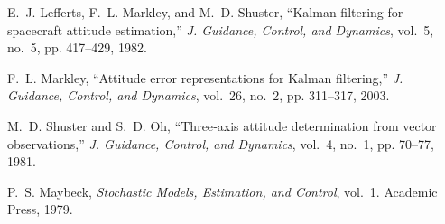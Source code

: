 \documentclass[12pt,letterpaper]{article}
\begin{document}
\begin{thebibliography}{9}
E.~J. Lefferts, F.~L. Markley, and M.~D. Shuster, “Kalman filtering for spacecraft attitude estimation,” \emph{J. Guidance, Control, and Dynamics}, vol.~5, no.~5, pp. 417–429, 1982.

F.~L. Markley, “Attitude error representations for Kalman filtering,” \emph{J. Guidance, Control, and Dynamics}, vol.~26, no.~2, pp. 311–317, 2003.

M.~D. Shuster and S.~D. Oh, “Three‐axis attitude determination from vector observations,” \emph{J. Guidance, Control, and Dynamics}, vol.~4, no.~1, pp. 70–77, 1981.

P.~S. Maybeck, \emph{Stochastic Models, Estimation, and Control}, vol.~1. Academic Press, 1979.

\end{thebibliography}
\end{document}
